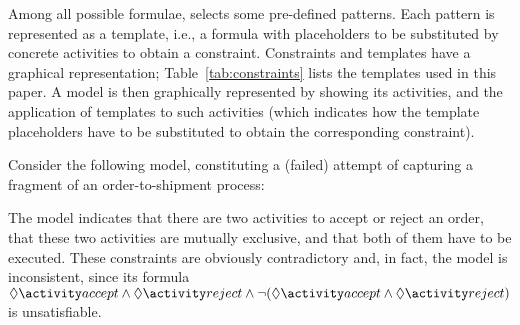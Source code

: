 Among all possible \LTLf formulae, \declare selects some pre-defined patterns. Each pattern is represented as a \declare template, i.e., a formula with placeholders to be substituted by concrete activities to obtain a constraint. Constraints and templates have a graphical representation; Table~\ref{tab:constraints} lists the \declare templates used in this paper. A \declare model is then graphically represented by showing its activities, and the application of templates to such activities (which indicates how the template placeholders have to be substituted to obtain the corresponding constraint).





\begin{example}
\label{ex:inconsistency}
Consider the following \declare model, constituting a (failed) attempt of capturing a fragment of an order-to-shipment process:

\begin{center}
\end{center}

The model indicates that there are two activities to accept or reject an order, that these two activities are mutually exclusive, and that both of them have to be executed.
These constraints are obviously contradictory and, in fact, the model is inconsistent, since its \LTLf formula
$
\Diamond \accept \land \Diamond \reject \land \neg (\Diamond \accept \land \Diamond \reject)
$
is unsatisfiable.
\end{example}



\endinput

\smallskip\noindent\textbf{\declare} is a constraint-based process modeling language based on \LTLf. Differently from imperative process modeling languages,
\declare models a process by fixing a set of activities, and defining a set of
\emph{temporal constraints} over them, accepting every execution trace that satisfies all constraints.
Constraints are specified via pre-defined \LTLf templates, which come with a corresponding
graphical representation (see Table~\ref{tab:constraints} for the \declare patterns we use in this paper).
For the sake of generality, in this paper we consider arbitrary \LTLf formulae as constraints. However, in the examples we consider formulae whose templates can be represented graphically in \declare.



Automata-based techniques for $\LTLf$ have been adopted in \declare to tackle fundamental tasks within the lifecycle of Declare processes, such as consistency checking \cite{PeSV07,MPVC11}, enactment and monitoring \cite{PeSV07,MMWV11,DDGM14}, and discovery support \cite{MaCV12}.
